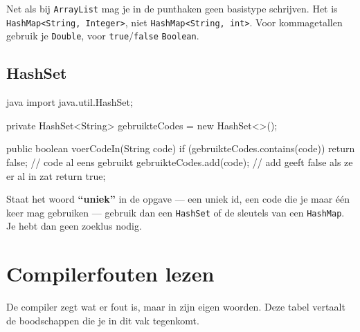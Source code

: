 \documentclass[a4paper,11pt]{article}
\begin{document}
\begin{warningbox}
    Net als bij \texttt{ArrayList} mag je in de punthaken geen basistype schrijven.
    Het is \texttt{HashMap<String, Integer>}, niet
    \texttt{HashMap<String, int>}. Voor kommagetallen gebruik je \texttt{Double},
    voor \texttt{true}/\texttt{false} \texttt{Boolean}.
\end{warningbox}

\subsection{HashSet}

\begin{codeblock}[hashset]{java}
    import java.util.HashSet;

    private HashSet<String> gebruikteCodes = new HashSet<>();

    public boolean voerCodeIn(String code) {
            if (gebruikteCodes.contains(code)) {
                    return false;         // code al eens gebruikt
                }
            gebruikteCodes.add(code); // add geeft false als ze er al in zat
            return true;
        }
\end{codeblock}

\begin{examenbox}
    Staat het woord \textbf{``uniek''} in de opgave --- een uniek id, een code die
    je maar \'e\'en keer mag gebruiken --- gebruik dan een \texttt{HashSet} of de
    sleutels van een \texttt{HashMap}. Je hebt dan geen zoeklus nodig.
\end{examenbox}


\section{Compilerfouten lezen}

De compiler zegt wat er fout is, maar in zijn eigen woorden. Deze tabel
vertaalt de boodschappen die je in dit vak tegenkomt.
\end{document}
